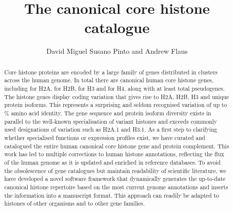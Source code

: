 \documentclass[10pt,a4paper,onecolumn,article]{memoir}
\author{David Miguel Susano Pinto and Andrew Flaus}
\title{The canonical core histone catalogue}
\begin{document}

  \maketitle

  \begin{abstract}
	Core histone proteins are encoded by a large family of genes distributed
	in  clusters across the human genome.
	In total there are \TotalGenes{} canonical human core histone genes, including
	\HTwoACodingGenes{} for H2A, \HTwoBCodingGenes{} for H2B,
	\HThreeCodingGenes{} for H3 and \HFourCodingGenes{} for H4, 
	along with at least \TotalPseudoGenes{} total pseudogenes.
	The histone genes display coding variation that gives rise to
	\HTwoAUniqueProteins{} H2A, \HTwoBUniqueProteins{} H2B, 
	\HThreeUniqueProteins{} H3 and \HFourUniqueProteins{} unique protein isoforms.
	This represents a surprising and seldom recognised variation
	of up to \% amino acid identity. 
	The gene sequence and protein isoform diversity exists 
	in parallel to the well-known specialisation of variant histones 
	and exceeds commonly used designations of variation such as H2A.1 and H3.1. 
	As a first step to clarifying whether specialised functions or expression profiles exist, 
	we have curated and catalogued the entire human canonical core histone gene and protein complement.
	This work has led to multiple corrections to human histone annotations, 
	reflecting the flux of the human genome as it is updated and enriched in reference databases. 
	To avoid the obsolescence of gene catalogues but maintain readability of scientific literature, 
	we have developed a novel software framework that dynamically generates the up-to-date canonical histone repertoire 
	based on the most current genome annotations and inserts the information into a manuscript format. 
	This approach can readily be adapted to histones of other organisms and to other gene families.
  \end{abstract}
\end{document}
